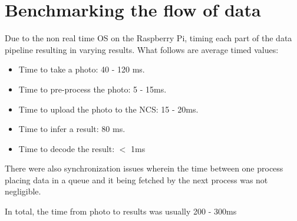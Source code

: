 \section{Benchmarking the flow of data}
Due to the non real time OS on the Raspberry Pi, timing each part of the data pipeline resulting in varying results. What follows are average timed values:

\begin{itemize}
\item Time to take a photo: 40 - 120 ms.
\item Time to pre-process the photo: 5 - 15ms.
\item Time to upload the photo to the NCS: 15 - 20ms.
\item Time to infer a result: 80 ms.
\item Time to decode the result: $<$ 1ms
\end{itemize}

There were also synchronization issues wherein the time between one process placing data in a queue and it being fetched by the next process was not negligible.

In total, the time from photo to results was usually 200 - 300ms
